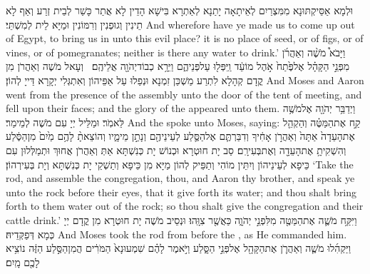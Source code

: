 {וּלְמָא אַסֵּיקְתּוּנָא מִמִּצְרַיִם לְאֵיתָאָה יָתַנָא לְאַתְרָא בִּישָׁא הָדֵין לָא אֲתַר כָּשַׁר לְבֵית זְרַע וְאַף לָא תֵינִין וְגוּפְנִין וְרִמּוֹנִין וּמַיָּא לֵית לְמִשְׁתֵּי׃}
{And wherefore have ye made us to come up out of Egypt, to bring us in unto this evil place? it is no place of seed, or of figs, or of vines, or of pomegranates; neither is there any water to drink.’}{}
{וַיָּבֹא֩ מֹשֶׁ֨ה וְאַהֲרֹ֜ן מִפְּנֵ֣י הַקָּהָ֗ל אֶל\maqqaf פֶּ֙תַח֙ אֹ֣הֶל מוֹעֵ֔ד וַֽיִּפְּל֖וּ עַל\maqqaf פְּנֵיהֶ֑ם וַיֵּרָ֥א כְבוֹד\maqqaf יְהֹוָ֖ה אֲלֵיהֶֽם׃ \petucha }
{וְעָאל מֹשֶׁה וְאַהֲרֹן מִן קֳדָם קְהָלָא לִתְרַע מַשְׁכַּן זִמְנָא וּנְפַלוּ עַל אַפֵּיהוֹן וְאִתְגְּלִי יְקָרָא דַּייָ לְהוֹן׃}
{And Moses and Aaron went from the presence of the assembly unto the door of the tent of meeting, and fell upon their faces; and the glory of the \lord\space appeared unto them.}{}
{וַיְדַבֵּ֥ר יְהֹוָ֖ה אֶל\maqqaf מֹשֶׁ֥ה לֵּאמֹֽר׃}
{וּמַלֵּיל יְיָ עִם מֹשֶׁה לְמֵימַר׃}
{And the \lord\space spoke unto Moses, saying:}{}
{קַ֣ח אֶת\maqqaf הַמַּטֶּ֗ה וְהַקְהֵ֤ל אֶת\maqqaf הָעֵדָה֙ אַתָּה֙ וְאַהֲרֹ֣ן אָחִ֔יךָ וְדִבַּרְתֶּ֧ם אֶל\maqqaf הַסֶּ֛לַע לְעֵינֵיהֶ֖ם וְנָתַ֣ן מֵימָ֑יו וְהוֹצֵאתָ֨ לָהֶ֥ם מַ֙יִם֙ מִן\maqqaf הַסֶּ֔לַע וְהִשְׁקִיתָ֥ אֶת\maqqaf הָעֵדָ֖ה וְאֶת\maqqaf בְּעִירָֽם׃}
{סַב יָת חוּטְרָא וּכְנוֹשׁ יָת כְּנִשְׁתָּא אַתְּ וְאַהֲרֹן אֲחוּךְ וּתְמַלְּלוּן עִם כֵּיפָא לְעֵינֵיהוֹן וְיִתֵּין מוֹהִי וְתַפֵּיק לְהוֹן מַיָּא מִן כֵּיפָא וְתַשְׁקֵי יָת כְּנִשְׁתָּא וְיָת בְּעִירְהוֹן׃}
{‘Take the rod, and assemble the congregation, thou, and Aaron thy brother, and speak ye unto the rock before their eyes, that it give forth its water; and thou shalt bring forth to them water out of the rock; so thou shalt give the congregation and their cattle drink.’}{}
{וַיִּקַּ֥ח מֹשֶׁ֛ה אֶת\maqqaf הַמַּטֶּ֖ה מִלִּפְנֵ֣י יְהֹוָ֑ה כַּאֲשֶׁ֖ר צִוָּֽהוּ׃}
{וּנְסֵיב מֹשֶׁה יָת חוּטְרָא מִן קֳדָם יְיָ כְּמָא דְּפַקְּדֵיהּ׃}
{And Moses took the rod from before the \lord, as He commanded him.}{}
{וַיַּקְהִ֜לוּ מֹשֶׁ֧ה וְאַהֲרֹ֛ן אֶת\maqqaf הַקָּהָ֖ל אֶל\maqqaf פְּנֵ֣י הַסָּ֑לַע וַיֹּ֣אמֶר לָהֶ֗ם שִׁמְעוּ\maqqaf נָא֙ הַמֹּרִ֔ים הֲמִן\maqqaf הַסֶּ֣לַע הַזֶּ֔ה נוֹצִ֥יא לָכֶ֖ם מָֽיִם׃}
